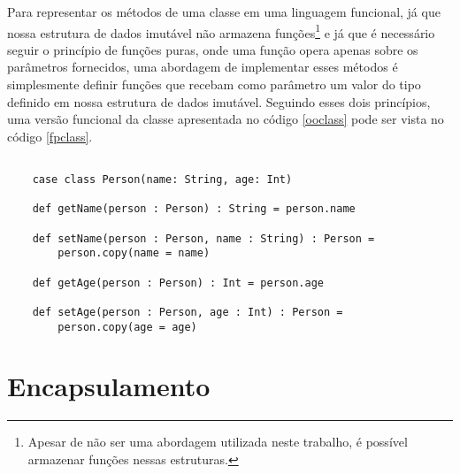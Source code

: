 Para representar os métodos de uma classe em uma 
linguagem funcional, já que nossa estrutura de dados 
imutável não armazena funções\footnote{Apesar de não 
ser uma abordagem utilizada neste trabalho, é 
possível armazenar funções nessas estruturas.} e já 
que é necessário seguir o princípio de funções puras, 
onde uma função opera apenas sobre os parâmetros 
fornecidos, uma abordagem de implementar esses 
métodos é simplesmente definir funções que recebam 
como parâmetro um valor do tipo definido em nossa 
estrutura de dados imutável. Seguindo esses dois 
princípios, uma versão funcional da classe apresentada 
no código \ref{ooclass} pode ser vista no código \ref{fpclass}.


\begin{lstlisting}[caption={Representação de uma classe no contexto funcional},label=fpclass]
    
    case class Person(name: String, age: Int)

    def getName(person : Person) : String = person.name

    def setName(person : Person, name : String) : Person = 
        person.copy(name = name)

    def getAge(person : Person) : Int = person.age

    def setAge(person : Person, age : Int) : Person =
        person.copy(age = age)

\end{lstlisting}

\section{Encapsulamento}







